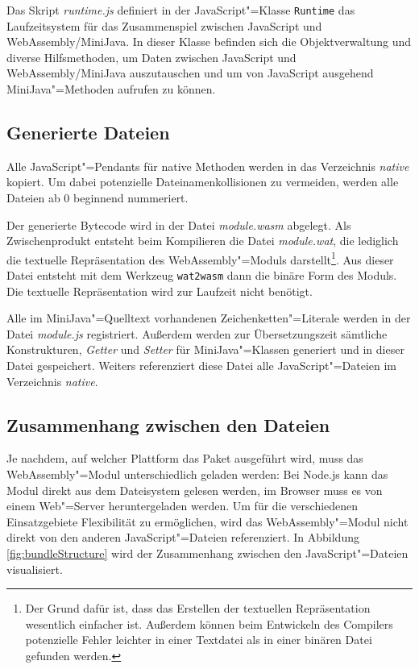 Das Skript \emph{runtime.js} definiert in der JavaScript"=Klasse \lstinline{Runtime} das Laufzeitsystem für das Zusammenspiel zwischen JavaScript und WebAssembly/MiniJava. In dieser Klasse befinden sich die Objektverwaltung und diverse Hilfsmethoden, um Daten zwischen JavaScript und WebAssembly/MiniJava auszutauschen und um von JavaScript ausgehend MiniJava"=Methoden aufrufen zu können.

\subsection{Generierte Dateien}

Alle JavaScript"=Pendants für native Methoden werden in das Verzeichnis \emph{native} kopiert. Um dabei potenzielle Dateinamenkollisionen zu vermeiden, werden alle Dateien ab 0 beginnend nummeriert.

Der generierte Bytecode wird in der Datei \emph{module.wasm} abgelegt. Als Zwischenprodukt entsteht beim Kompilieren die Datei \emph{module.wat}, die lediglich die textuelle Repräsentation des WebAssembly"=Moduls darstellt\footnote{Der Grund dafür ist, dass das Erstellen der textuellen Repräsentation wesentlich einfacher ist. Außerdem können beim Entwickeln des Compilers potenzielle Fehler leichter in einer Textdatei als in einer binären Datei gefunden werden.}. Aus dieser Datei entsteht mit dem Werkzeug \lstinline{wat2wasm} \cite{WABT} dann die binäre Form des Moduls. Die textuelle Repräsentation wird zur Laufzeit nicht benötigt.

Alle im MiniJava"=Quelltext vorhandenen Zeichenketten"=Literale werden in der Datei \emph{module.js} registriert. Außerdem werden zur Übersetzungszeit sämtliche Konstrukturen, \emph{Getter} und \emph{Setter} für MiniJava"=Klassen generiert und in dieser Datei gespeichert. Weiters referenziert diese Datei alle JavaScript"=Dateien im Verzeichnis \emph{native}.

\subsection{Zusammenhang zwischen den Dateien}

Je nachdem, auf welcher Plattform das Paket ausgeführt wird, muss das WebAssembly"=Modul unterschiedlich geladen werden: Bei Node.js kann das Modul direkt aus dem Dateisystem gelesen werden, im Browser muss es von einem Web"=Server heruntergeladen werden. Um für die verschiedenen Einsatzgebiete Flexibilität zu ermöglichen, wird das WebAssembly"=Modul nicht direkt von den anderen JavaScript"=Dateien referenziert. In Abbildung \ref{fig:bundleStructure} wird der Zusammenhang zwischen den JavaScript"=Dateien visualisiert.

